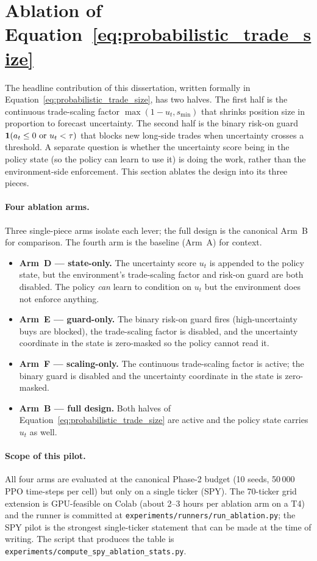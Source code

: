 \section{Ablation of Equation~\ref{eq:probabilistic_trade_size}}
\label{sec:ablation}

The headline contribution of this dissertation, written formally in Equation~\ref{eq:probabilistic_trade_size}, has two halves. The first half is the continuous trade-scaling factor $\max(1 - u_t, s_{\min})$ that shrinks position size in proportion to forecast uncertainty. The second half is the binary risk-on guard $\mathbf{1}(a_t \leq 0 \text{ or } u_t < \tau)$ that blocks new long-side trades when uncertainty crosses a threshold. A separate question is whether the uncertainty score being in the policy state (so the policy can learn to use it) is doing the work, rather than the environment-side enforcement. This section ablates the design into its three pieces.

\paragraph{Four ablation arms.} Three single-piece arms isolate each lever; the full design is the canonical Arm~B for comparison. The fourth arm is the baseline (Arm~A) for context.

\begin{itemize}[leftmargin=*]
  \item \textbf{Arm~D --- state-only.} The uncertainty score $u_t$ is appended to the policy state, but the environment's trade-scaling factor and risk-on guard are both disabled. The policy \emph{can} learn to condition on $u_t$ but the environment does not enforce anything.
  \item \textbf{Arm~E --- guard-only.} The binary risk-on guard fires (high-uncertainty buys are blocked), the trade-scaling factor is disabled, and the uncertainty coordinate in the state is zero-masked so the policy cannot read it.
  \item \textbf{Arm~F --- scaling-only.} The continuous trade-scaling factor is active; the binary guard is disabled and the uncertainty coordinate in the state is zero-masked.
  \item \textbf{Arm~B --- full design.} Both halves of Equation~\ref{eq:probabilistic_trade_size} are active and the policy state carries $u_t$ as well.
\end{itemize}

\paragraph{Scope of this pilot.} All four arms are evaluated at the canonical Phase-2 budget (10 seeds, 50\,000 PPO time-steps per cell) but only on a single ticker (SPY). The 70-ticker grid extension is GPU-feasible on Colab (about 2--3 hours per ablation arm on a T4) and the runner is committed at \texttt{experiments/runners/run\_ablation.py}; the SPY pilot is the strongest single-ticker statement that can be made at the time of writing. The script that produces the table is \texttt{experiments/compute\_spy\_ablation\_stats.py}.

